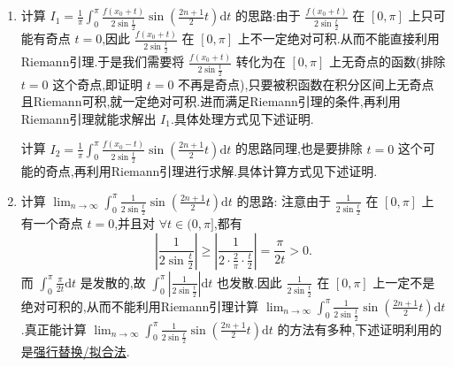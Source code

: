 \documentclass[../../main.tex]{subfiles}
\begin{document}
\begin{note}
\begin{enumerate}[(1)]
\item 计算 \(I_1=\frac{1}{\pi}\int_0^{\pi}{\frac{f(x_0 + t)}{2\sin \frac{t}{2}}\sin \left( \frac{2n + 1}{2}t \right) \mathrm{d}t}\) 的思路:由于 \(\frac{f(x_0 + t)}{2\sin \frac{t}{2}}\) 在 \([0, \pi]\) 上只可能有奇点 \(t = 0\),因此 \(\frac{f(x_0 + t)}{2\sin \frac{t}{2}}\) 在 \([0, \pi]\) 上不一定绝对可积.从而不能直接利用Riemann引理.于是我们需要将 \(\frac{f(x_0 + t)}{2\sin \frac{t}{2}}\) 转化为在 \([0, \pi]\) 上无奇点的函数(排除 \(t = 0\) 这个奇点,即证明 \(t = 0\) 不再是奇点),只要被积函数在积分区间上无奇点且Riemann可积,就一定绝对可积.进而满足Riemann引理的条件,再利用Riemann引理就能求解出 \(I_1\).具体处理方式见下述证明.

计算 \(I_2=\frac{1}{\pi}\int_0^{\pi}{\frac{f(x_0 - t)}{2\sin \frac{t}{2}}\sin \left( \frac{2n + 1}{2}t \right) \mathrm{d}t}\) 的思路同理,也是要排除 \(t = 0\) 这个可能的奇点,再利用Riemann引理进行求解.具体计算方式见下述证明.

\item 计算 \(\lim_{n\rightarrow \infty} \int_0^{\pi}{\frac{1}{2\sin \frac{t}{2}}\sin \left( \frac{2n + 1}{2}t \right) \mathrm{d}t}\) 的思路:
注意由于 \(\frac{1}{2\sin \frac{t}{2}}\) 在 \([0, \pi]\) 上有一个奇点 \(t = 0\),并且对 \(\forall t\in (0, \pi]\),都有
\[
\left| \frac{1}{2\sin \frac{t}{2}} \right|\geqslant \left| \frac{1}{2\cdot \frac{2}{\pi}\cdot \frac{t}{2}} \right|=\frac{\pi}{2t}>0.
\]
而 \(\int_0^{\pi}{\frac{\pi}{2t}\mathrm{d}t}\) 是发散的,故 \(\int_0^{\pi}{\left| \frac{1}{2\sin \frac{t}{2}} \right|\mathrm{d}t}\) 也发散.因此 \(\frac{1}{2\sin \frac{t}{2}}\) 在 \([0, \pi]\) 上一定不是绝对可积的,从而不能利用Riemann引理计算 \(\lim_{n\rightarrow \infty} \int_0^{\pi}{\frac{1}{2\sin \frac{t}{2}}\sin \left( \frac{2n + 1}{2}t \right) \mathrm{d}t}\).真正能计算 \(\lim_{n\rightarrow \infty} \int_0^{\pi}{\frac{1}{2\sin \frac{t}{2}}\sin \left( \frac{2n + 1}{2}t \right) \mathrm{d}t}\) 的方法有多种,下述证明利用的是\hyperref[强行替换(拟合法)和凑定积分]{强行替换/拟合法}.
\end{enumerate}
\end{note}
\end{document}
